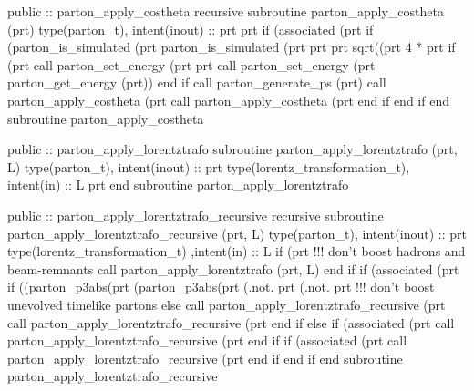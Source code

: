 \eatline
\nwendcode{}\nwdocspar
\nwenddocs{}\plusendmoddef
  public :: parton_apply_costheta
\nwendcode{}\plusendmoddef
  recursive subroutine parton_apply_costheta (prt)
    type(parton_t), intent(inout) :: prt
    prt%
    if (associated (prt%
       if (parton_is_simulated (prt%
           parton_is_simulated (prt%
          prt%
               prt%
                sqrt((prt%
                4 * prt%
          if (prt%
             call parton_set_energy (prt%
                  prt%
             call parton_set_energy (prt%
                  parton_get_energy (prt))
          end if
          call parton_generate_ps (prt)
          call parton_apply_costheta (prt%
          call parton_apply_costheta (prt%
       end if
    end if
  end subroutine parton_apply_costheta

\eatline
\nwendcode{}\nwdocspar
\nwenddocs{}\plusendmoddef
  public :: parton_apply_lorentztrafo
\nwendcode{}\plusendmoddef
  subroutine parton_apply_lorentztrafo (prt, L)
    type(parton_t), intent(inout) :: prt
    type(lorentz_transformation_t), intent(in) :: L
    prt%
  end subroutine parton_apply_lorentztrafo

\eatline
\nwendcode{}\nwdocspar
\nwenddocs{}\plusendmoddef
  public :: parton_apply_lorentztrafo_recursive
\nwendcode{}\plusendmoddef
  recursive subroutine parton_apply_lorentztrafo_recursive (prt, L)
    type(parton_t), intent(inout) :: prt
    type(lorentz_transformation_t) ,intent(in) :: L
    if (prt%
       !!! don't boost hadrons and beam-remnants
       call parton_apply_lorentztrafo (prt, L)
    end if
    if (associated (prt%
       if ((parton_p3abs(prt%
           (parton_p3abs(prt%
           (.not. prt%
           (.not. prt%
          !!! don't boost unevolved timelike partons
       else
          call parton_apply_lorentztrafo_recursive (prt%
          call parton_apply_lorentztrafo_recursive (prt%
       end if
    else
       if (associated (prt%
          call parton_apply_lorentztrafo_recursive (prt%
       end if
       if (associated (prt%
          call parton_apply_lorentztrafo_recursive (prt%
       end if
    end if
  end subroutine parton_apply_lorentztrafo_recursive

